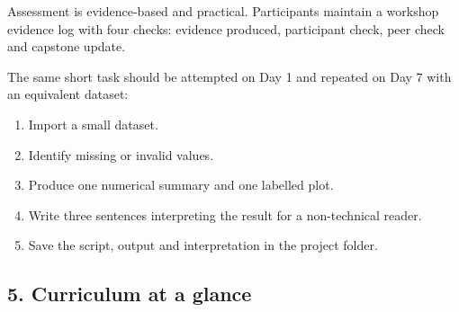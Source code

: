 \documentclass[11pt]{article}
\providecommand{\tightlist}{%
  \setlength{\itemsep}{0pt}\setlength{\parskip}{0pt}}
\begin{document}
Assessment is evidence-based and practical. Participants maintain a
workshop evidence log with four checks: evidence produced, participant
check, peer check and capstone update.

The same short task should be attempted on Day 1 and repeated on Day 7
with an equivalent dataset:

\begin{enumerate}
\def\labelenumi{\arabic{enumi}.}
\tightlist
\item
  Import a small dataset.
\item
  Identify missing or invalid values.
\item
  Produce one numerical summary and one labelled plot.
\item
  Write three sentences interpreting the result for a non-technical
  reader.
\item
  Save the script, output and interpretation in the project folder.
\end{enumerate}

\hypertarget{curriculum-at-a-glance}{%
\subsection{5. Curriculum at a glance}\label{curriculum-at-a-glance}}
\end{document}

